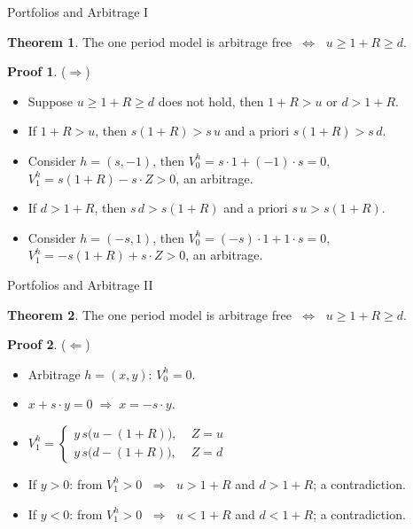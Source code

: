 \documentclass[10pt]{beamer}
\newcommand{\ds}{\displaystyle}
\newcommand{\ie}{\;\Longrightarrow\;}
\newcommand{\ifff}{\;\Longleftrightarrow\;}
\theoremstyle{definition}
\newtheorem*{thm}{Theorem}
\newtheorem*{prf}{Proof}
\begin{document}
\begin{frame}{Portfolios and Arbitrage I}
  \begin{thm}
    The one period model is arbitrage free $\ifff$ $\ds u\geqslant 1+R \geqslant d$.
  \end{thm}
  \begin{prf}
    ($\Longrightarrow$)
    \begin{itemize}
      \item Suppose $u\geqslant 1+R \geqslant d$ does not hold, then $1 + R > u$ or $d > 1 + R$.
      \item If $1 + R > u$, then $s(1 + R) > s\,u$ and a priori $s(1+R) > s\,d$.
      \item Consider $h = (s, -1)$, then $V_0^h = s\cdot 1 + (-1)\cdot s = 0$, $V_1^h = s(1 + R) - s\cdot Z >0$, an arbitrage.
      \item If $d > 1 + R$, then $s\,d > s(1 + R)$ and a priori $s\,u > s(1 + R)$.
      \item Consider $h = (-s, 1)$, then $V_0^h = (-s)\cdot 1 + 1\cdot s = 0$, $V_1^h = -s(1 + R) + s\cdot Z > 0$, an arbitrage.
    \end{itemize}
  \end{prf}
\end{frame}
\begin{frame}{Portfolios and Arbitrage II}
  \begin{thm}
    The one period model is arbitrage free $\ifff$ $\ds u\geqslant 1+R \geqslant d$.
  \end{thm}
  \begin{prf}
    ($\Longleftarrow$)
    \begin{itemize}
      \item Arbitrage $h = (x, y)$: $V_0^h = 0$.
      \item $ x + s\cdot y = 0\ie x= -s\cdot y$. 
      \item $\ds V_1^h = \begin{cases}y\,s\big(u - (1 + R)\big),&\; Z=u \\ y\,s\big(d - (1 + R)\big),&\; Z=d\end{cases}$
      \item If $y > 0$: from $\ds V_1^h > 0$ $\ie$ $u > 1 + R$ and $d > 1 + R$; a contradiction.
      \item If $y < 0$: from $\ds V_1^h > 0$ $\ie$ $u < 1 + R$ and $d < 1 + R$; a contradiction.
    \end{itemize}
  \end{prf}
\end{frame}
\end{document}
